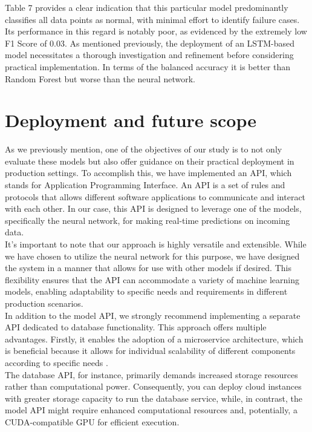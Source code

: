 \documentclass{article}
\begin{document}
Table 7 provides a clear indication that this particular model predominantly classifies all data points as normal, with minimal effort to identify failure cases. Its performance in this regard is notably poor, as evidenced by the extremely low F1 Score of 0.03. As mentioned previously, the deployment of an LSTM-based model necessitates a thorough investigation and refinement before considering practical implementation. In terms of the balanced accuracy it is better than Random Forest but worse than the neural network.


\section{Deployment and future scope}
As we previously mention, one of the objectives of our study is to not only evaluate these models but also offer guidance on their practical deployment in production settings. To accomplish this, we have implemented an API, which stands for Application Programming Interface. An API is a set of rules and protocols that allows different software applications to communicate and interact with each other. In our case, this API is designed to leverage one of the models, specifically the neural network, for making real-time predictions on incoming data.\\

It's important to note that our approach is highly versatile and extensible. While we have chosen to utilize the neural network for this purpose, we have designed the system in a manner that allows for use with other models if desired. This flexibility ensures that the API can accommodate a variety of machine learning models, enabling adaptability to specific needs and requirements in different production scenarios.\\

In addition to the model API, we strongly recommend implementing a separate API dedicated to database functionality. This approach offers multiple advantages. Firstly, it enables the adoption of a microservice architecture, which is beneficial because it allows for individual scalability of different components according to specific needs \cite{Patel2021}. \\

The database API, for instance, primarily demands increased storage resources rather than computational power. Consequently, you can deploy cloud instances with greater storage capacity to run the database service, while, in contrast, the model API might require enhanced computational resources and, potentially, a CUDA-compatible GPU for efficient execution.\\
\end{document}
